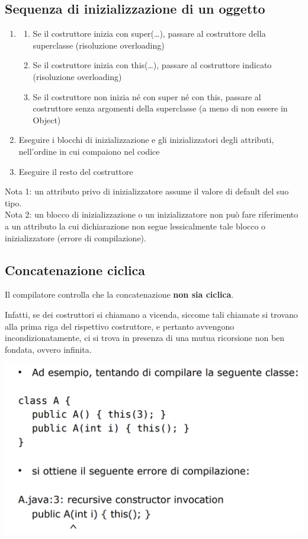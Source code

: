 \documentclass[10pt]{article}
\begin{document}
\subsection{Sequenza di inizializzazione di un oggetto}
\begin{enumerate}
    \item \begin{enumerate}
        \item Se il costruttore inizia con super(…), passare al costruttore della superclasse (risoluzione overloading)
        \item Se il costruttore inizia con this(…), passare al costruttore indicato (risoluzione overloading)
        \item Se il costruttore non inizia né con super né con this, passare al costruttore senza argomenti della 
        superclasse (a meno di non essere in Object)
    \end{enumerate}
    \item Eseguire i blocchi di inizializzazione e gli inizializzatori degli attributi, nell’ordine in cui compaiono nel codice
    \item Eseguire il resto del costruttore
\end{enumerate}
Nota 1: un attributo privo di inizializzatore assume il valore di default del suo tipo.\\
Nota 2: un blocco di inizializzazione o un inizializzatore non può fare riferimento a un attributo la cui 
dichiarazione non segue lessicalmente tale blocco o inizializzatore (errore di compilazione).
\subsection{Concatenazione ciclica}
Il compilatore controlla che la concatenazione \textbf{non sia ciclica}.

Infatti, se dei costruttori si chiamano a vicenda, siccome tali chiamate si trovano alla prima riga del 
rispettivo costruttore, e pertanto avvengono incondizionatamente, ci si trova in presenza di una 
mutua ricorsione non ben fondata, ovvero infinita.

\includegraphics[scale=0.5]{Immagini/Concatenazione_ciclica.png}
\end{document}
